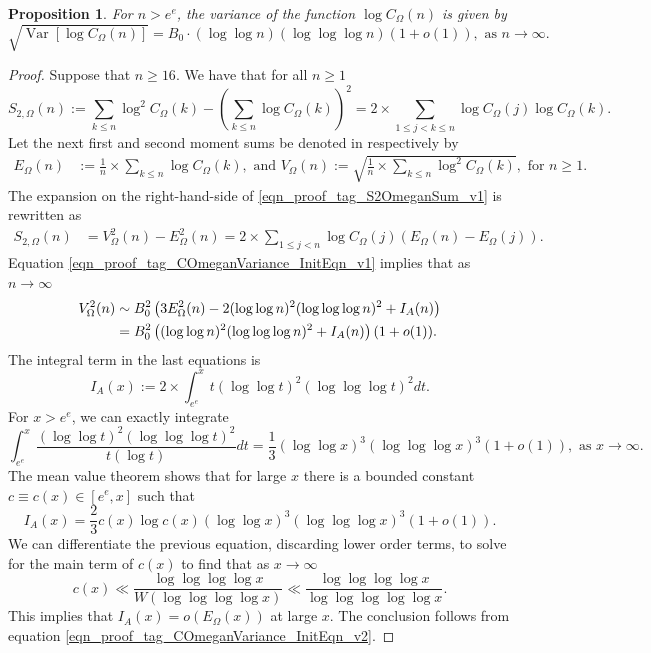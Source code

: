 \documentclass[11pt,reqno,a4letter]{article}
\numberwithin{equation}{section}
\numberwithin{figure}{section}
\numberwithin{table}{section}
\theoremstyle{plain}
\newtheorem{prop}[theorem]{Proposition}
\numberwithin{theorem}{section}
\theoremstyle{definition}
\begin{document}
\begin{prop}
\label{prop_VarianceStat_for_COmegan_v1}
\label{prop_COmeganFunc_Variance_v1}
For $n > e^e$, the variance of the function $\log C_{\Omega}(n)$ is given by
\[
\sqrt{\operatorname{Var}\left[\log C_{\Omega}(n)\right]} = 
	B_0 \cdot (\log\log n) (\log\log\log n) \left(1 + o(1)\right), 
	\text{ as } n \rightarrow \infty. 
\]
\end{prop}
\begin{proof}
Suppose that $n \geq 16$. We have that for all $n \geq 1$  
\begin{equation}
\label{eqn_proof_tag_S2OmeganSum_v1}
S_{2,\Omega}(n) := \sum_{k \leq n} \log^2 C_{\Omega}(k) - 
     \left(\sum_{k \leq n} \log C_{\Omega}(k)\right)^2 = 
	2 \times \sum_{1 \leq j < k \leq n} \log C_{\Omega}(j) \log C_{\Omega}(k).
\end{equation}
Let the next first and second moment sums be denoted in respectively by 
\begin{align*}
E_{\Omega}(n) & := \frac{1}{n} \times \sum_{k \leq n} \log C_{\Omega}(k), 
     \text{ and } 
V_{\Omega}(n) := \sqrt{\frac{1}{n} \times \sum_{k \leq n} \log^2 C_{\Omega}(k)}, 
	\text{ for } n \geq 1. 
\end{align*}
The expansion on the right-hand-side of \eqref{eqn_proof_tag_S2OmeganSum_v1} is rewritten as 
\begin{align}
\label{eqn_proof_tag_COmeganVariance_InitEqn_v1}
S_{2,\Omega}(n) & = V_{\Omega}^2(n) - E_{\Omega}^2(n) = 
     2 \times \sum_{1 \leq j < n} \log C_{\Omega}(j) \left(
     E_{\Omega}(n) - E_{\Omega}(j)\right). 
\end{align} 
Equation \eqref{eqn_proof_tag_COmeganVariance_InitEqn_v1} implies that as $n \rightarrow \infty$ 
\begin{align}
\notag
V_{\Omega}^2(n) & \sim B_0^2 \left(3E_{\Omega}^2(n) - 
	2 (\log\log n)^2 (\log\log\log n)^2 + I_A(n)\right) \\ 
\label{eqn_proof_tag_COmeganVariance_InitEqn_v2}
	& =  B_0^2 \left((\log\log n)^2 (\log\log\log n)^2 + I_A(n)\right) (1+o(1)). 
\end{align} 
The integral term in the last equations is 
\[
I_A(x) := 2 \times \int_{e^e}^x t (\log\log t)^2 (\log\log\log t)^2 dt. 
\]
For $x > e^e$, we can exactly integrate 
\[
\int_{e^e}^x \frac{(\log\log t)^2 (\log\log\log t)^2}{t(\log t)} dt = 
	\frac{1}{3} (\log\log x)^3 (\log\log\log x)^3 (1+o(1)), 
	\text{ as } x \rightarrow \infty. 
\]
The mean value theorem shows that for large $x$ there is a bounded constant 
$c \equiv c(x) \in [e^e, x]$ such that 
\[
I_A(x) = \frac{2}{3} c(x) \log c(x) (\log\log x)^3 (\log\log\log x)^3 (1+o(1)). 
\]
We can differentiate the previous equation, discarding lower order terms, to solve 
for the main term of $c(x)$ to find that as $x \rightarrow \infty$ 
\[
c(x) \ll \frac{\log\log\log\log x}{W\left(\log\log\log\log x\right)} \ll 
	\frac{\log\log\log\log x}{\log\log\log\log\log x}.
\]
This implies that $I_A(x) = o\left(E_{\Omega}(x)\right)$ at large $x$. 
The conclusion follows from equation \eqref{eqn_proof_tag_COmeganVariance_InitEqn_v2}. 
\end{proof}
\end{document}
